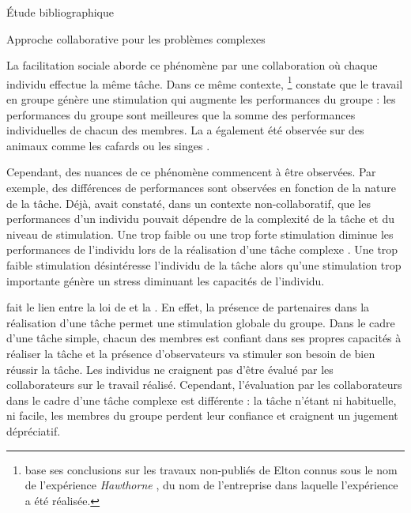 \documentclass[myfrancais,ngerman,english,french]{mythesis}
\begin{document}
\begin{mychapter}{Étude bibliographique}
\begin{mysection}{Approche collaborative pour les problèmes complexes}
\begin{mysubsection}{La facilitation sociale}
				 aborde ce phénomène par une collaboration où chaque individu effectue la même tâche.
				Dans ce même contexte, \footnote{ base ses conclusions sur les travaux non-publiés de Elton  connus sous le nom de \og l'expérience \textit{Hawthorne} \fg, du nom de l'entreprise \myHawthorne dans laquelle l'expérience a été réalisée.} constate que le travail en groupe génère une stimulation qui augmente les performances du groupe : les performances du groupe sont meilleures que la somme des performances individuelles de chacun des membres.
				La  a également été observée sur des animaux comme les cafards  ou les singes .

				Cependant, des nuances de ce phénomène commencent à être observées.
				Par exemple, des différences de performances sont observées en fonction de la nature de la tâche.
				Déjà,  avait constaté, dans un contexte non-collaboratif, que les performances d'un individu pouvait dépendre de la complexité de la tâche et du niveau de stimulation.
				Une trop faible ou une trop forte stimulation diminue les performances de l'individu lors de la réalisation d'une tâche complexe .
				Une trop faible stimulation désintéresse l'individu de la tâche alors qu'une stimulation trop importante génère un stress diminuant les capacités de l'individu.

				 fait le lien entre la loi de  et la .
				En effet, la présence de partenaires dans la réalisation d'une tâche permet une stimulation globale du groupe.
				Dans le cadre d'une tâche simple, chacun des membres est confiant dans ses propres capacités à réaliser la tâche et la présence d'observateurs va stimuler son besoin de bien réussir la tâche.
				Les individus ne craignent pas d'être évalué par les collaborateurs sur le travail réalisé.
				Cependant, l'évaluation par les collaborateurs dans le cadre d'une tâche complexe est différente : la tâche n'étant ni habituelle, ni facile, les membres du groupe perdent leur confiance et craignent un jugement dépréciatif.


\end{mysubsection}
\end{mysection}
\end{mychapter}
\end{document}
